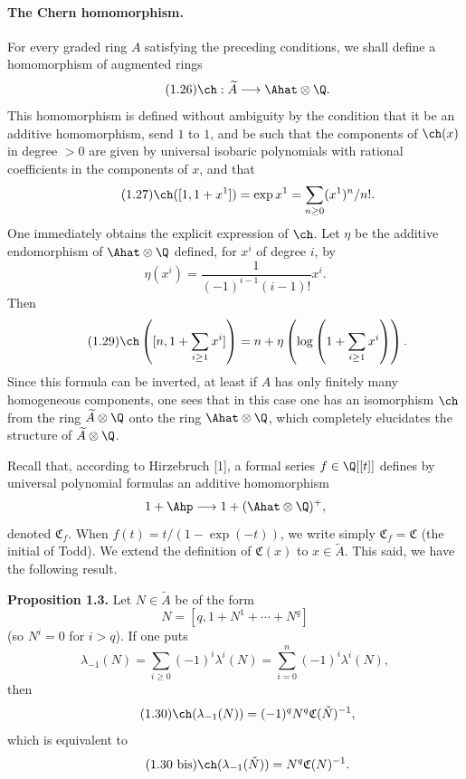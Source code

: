 \paragraph{The Chern homomorphism.}
For every graded ring $A$ satisfying the preceding conditions, we shall define a homomorphism of augmented rings
\begin{equation}\tag{1.26}
\ch:\widetilde A\longrightarrow \Ahat\otimes\Q.
\end{equation}
This homomorphism is defined without ambiguity by the condition that it be an additive homomorphism, send $1$ to $1$, and be such that the components of $\ch(x)$ in degree $>0$ are given by universal isobaric polynomials with rational coefficients in the components of $x$, and that
\begin{equation}\tag{1.27}
\ch([1,1+x^1])=\exp x^1=\sum_{n\geq 0}(x^1)^n/n!.
\end{equation}
One immediately obtains the explicit expression of $\ch$. Let $\eta$ be the additive endomorphism of $\Ahat\otimes\Q$ defined, for $x^i$ of degree $i$, by
\begin{equation}\tag{1.28}
\eta(x^i)=\frac{1}{(-1)^{i-1}(i-1)!}x^i .
\end{equation}
Then
\begin{equation}\tag{1.29}
\ch\left([n,1+\sum_{i\geq 1}x^i]\right)
=n+\eta\left(\log\left(1+\sum_{i\geq 1}x^i\right)\right).
\end{equation}
Since this formula can be inverted, at least if $A$ has only finitely many homogeneous components, one sees that in this case one has an isomorphism $\ch$ from the ring $\widetilde A\otimes\Q$ onto the ring $\Ahat\otimes\Q$, which completely elucidates the structure of $\widetilde A\otimes\Q$.

Recall that, according to Hirzebruch [1], a formal series $f\in\Q[[t]]$ defines by universal polynomial formulas an additive homomorphism
\[
1+\Ahp\longrightarrow 1+(\Ahat\otimes\Q)^+,
\]
denoted $\mathfrak C_f$. When $f(t)=t/(1-\exp(-t))$, we write simply $\mathfrak C_f=\mathfrak C$ (the initial of Todd). We extend the definition of $\mathfrak C(x)$ to $x\in\widetilde A$. This said, we have the following result.

\textbf{Proposition 1.3.} Let $N\in\widetilde A$ be of the form
\[
N=[q,1+N^1+\cdots+N^q]
\]
(so $N^i=0$ for $i>q$). If one puts
\[
\lambda_{-1}(N)=\sum_{i\geq 0}(-1)^i\lambda^i(N)=\sum_{i=0}^{n}(-1)^i\lambda^i(N),
\]
then
\begin{equation}\tag{1.30}
\ch(\lambda_{-1}(N))=(-1)^qN^q\mathfrak C(\check N)^{-1},
\end{equation}
which is equivalent to
\begin{equation}\tag{1.30 bis}
\ch(\lambda_{-1}(\check N))=N^q\mathfrak C(N)^{-1}.
\end{equation}

